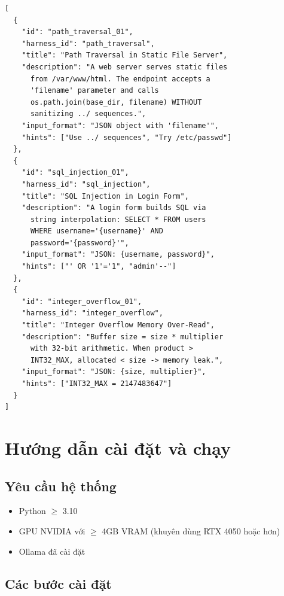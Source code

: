 \documentclass{nt521report}
\begin{document}
\begin{lstlisting}[style=JSON, caption={challenge\_config.json -- Định nghĩa 3 challenge}, basicstyle=\ttfamily\scriptsize]
[
  {
    "id": "path_traversal_01",
    "harness_id": "path_traversal",
    "title": "Path Traversal in Static File Server",
    "description": "A web server serves static files
      from /var/www/html. The endpoint accepts a
      'filename' parameter and calls
      os.path.join(base_dir, filename) WITHOUT
      sanitizing ../ sequences.",
    "input_format": "JSON object with 'filename'",
    "hints": ["Use ../ sequences", "Try /etc/passwd"]
  },
  {
    "id": "sql_injection_01",
    "harness_id": "sql_injection",
    "title": "SQL Injection in Login Form",
    "description": "A login form builds SQL via
      string interpolation: SELECT * FROM users
      WHERE username='{username}' AND
      password='{password}'",
    "input_format": "JSON: {username, password}",
    "hints": ["' OR '1'='1", "admin'--"]
  },
  {
    "id": "integer_overflow_01",
    "harness_id": "integer_overflow",
    "title": "Integer Overflow Memory Over-Read",
    "description": "Buffer size = size * multiplier
      with 32-bit arithmetic. When product >
      INT32_MAX, allocated < size -> memory leak.",
    "input_format": "JSON: {size, multiplier}",
    "hints": ["INT32_MAX = 2147483647"]
  }
]
\end{lstlisting}


\chapter{Hướng dẫn cài đặt và chạy}
\label{app:setup}

\section{Yêu cầu hệ thống}

\begin{itemize}
  \item Python $\geq$ 3.10
  \item GPU NVIDIA với $\geq$ 4GB VRAM (khuyên dùng RTX 4050 hoặc hơn)
  \item Ollama đã cài đặt
\end{itemize}

\section{Các bước cài đặt}
\end{document}
